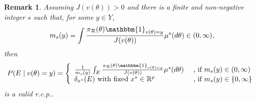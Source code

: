 \documentclass[10pt,fleqn]{article}
\newtheorem{remark}{Remark}
\newcommand{\be}{\begin{equation}\begin{aligned}}
\newcommand{\ee}{\end{aligned}\end{equation}}
\newcommand{\bb}[1]{\mathbb{#1}}
\newcommand{\mc}[1]{\mathcal{#1}}
\DeclareMathOperator{\1}{\mathbbm{1}}
\begin{document}
\begin{remark}
Assuming $J(v(\theta))> 0$ and there is a finite and
non-negative integer $s$ such
that, for some $y\in Y$,
\be
m_s(y)=\int \frac{\pi_{\mc
R}(\theta)
\mathbbm{1}_{v({\theta})=y}}{J(v(\theta))}\mu^s(d\theta)\in(0,\infty),
\ee
then
\begin{equation}
P(E\mid v(\theta)=y)=\left\{\begin{array}{ll}  \frac{1}{m_s(y)}\int_{E } \frac{\pi_{\mc
R}(\theta) \mathbbm{1}_{v({\theta})=y}}{J(v(\theta))}\mu^s(d\theta)
& \text{  , if }m_s(y)\in(0,\infty) \\
\delta_{x^*}(E) \text{ with fixed } x^*\in \bb R^p
& \text{  , if }m_s(y)\in\{0,\infty\} \\
\end{array}\right.
\end{equation}
is a valid r.c.p..
\end{remark}
\end{document}
